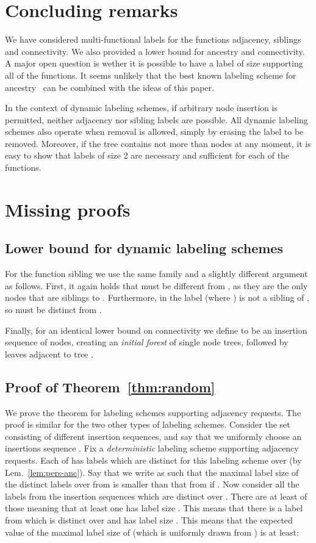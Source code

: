 \documentclass{llncs}
\begin{document}
\section{Concluding remarks}
We have considered multi-functional labels for the functions adjacency, siblings and connectivity.
We also provided a lower bound for ancestry and connectivity.
A major open question is wether it is possible to have a label of size  supporting all of the functions.
It seems unlikely that the best known labeling scheme for ancestry~\cite{Korman10} can be combined with the ideas of this paper.

In the context of dynamic labeling schemes, if arbitrary node insertion is permitted, neither adjacency nor sibling labels are  possible. All dynamic labeling schemes also operate when removal is allowed, simply by erasing the label to be removed. Moreover, if the tree contains  not more than  nodes at any moment, it is easy to show that labels of size  2   are necessary and sufficient for each of the  functions.
  
  
\appendix
\section{Missing proofs}
\subsection{Lower bound for  dynamic labeling schemes}\label{lower-simple}
For the function sibling we use  the same family and a slightly different argument as follows.
First, it again holds that   must be different from
, as they are the  only nodes that are siblings to .
Furthermore, in  the label  (where ) is not a sibling of
, so  must be distinct from .

Finally, for an identical  lower bound on connectivity we define
 to be an  insertion sequence   of   nodes, creating  an
\emph{initial  forest } of   single node trees, followed by  
leaves adjacent to tree . 

\subsection{Proof of Theorem~\ref{thm:random}} \label{proof:random}
\newcommand{\F}{\mathcal{F}}
We  prove the theorem for labeling schemes supporting adjacency requests.
The proof is similar for the two other types of labeling schemes.
Consider the set  consisting of 
different insertion sequences, and say that we uniformly choose an insertions
sequence .
Fix a \emph{deterministic} labeling scheme supporting adjacency requests.
Each of  has 
labels which are distinct for this labeling scheme over  (by
Lem.~\ref{lem:pers-anc}).
Say that we write  as  such that
the maximal label size of the distinct labels over  from 
is smaller than that from  if . Now consider all the labels from the
insertion sequences  which are distinct over . There are at
least  of those meaning that at least one has label size .
This means that there is a label from  which is distinct over  and
has label size . This means that the expected value of
the maximal label size of  (which is uniformly drawn from ) is at least:
\end{document}
